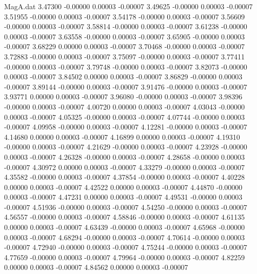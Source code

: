\begin{filecontents}{MagA.dat}
   3.47300   -0.00000    0.00003   -0.00007
   3.49625   -0.00000    0.00003   -0.00007
   3.51955   -0.00000    0.00003   -0.00007
   3.54178   -0.00000    0.00003   -0.00007
   3.56609   -0.00000    0.00003   -0.00007
   3.58814   -0.00000    0.00003   -0.00007
   3.61238   -0.00000    0.00003   -0.00007
   3.63558   -0.00000    0.00003   -0.00007
   3.65905   -0.00000    0.00003   -0.00007
   3.68229    0.00000    0.00003   -0.00007
   3.70468   -0.00000    0.00003   -0.00007
   3.72883   -0.00000    0.00003   -0.00007
   3.75097   -0.00000    0.00003   -0.00007
   3.77411   -0.00000    0.00003   -0.00007
   3.79748   -0.00000    0.00003   -0.00007
   3.82073   -0.00000    0.00003   -0.00007
   3.84502    0.00000    0.00003   -0.00007
   3.86829   -0.00000    0.00003   -0.00007
   3.89144   -0.00000    0.00003   -0.00007
   3.91476   -0.00000    0.00003   -0.00007
   3.93771    0.00000    0.00003   -0.00007
   3.96080   -0.00000    0.00003   -0.00007
   3.98396   -0.00000    0.00003   -0.00007
   4.00720    0.00000    0.00003   -0.00007
   4.03043   -0.00000    0.00003   -0.00007
   4.05325   -0.00000    0.00003   -0.00007
   4.07744   -0.00000    0.00003   -0.00007
   4.09958   -0.00000    0.00003   -0.00007
   4.12281   -0.00000    0.00003   -0.00007
   4.14680    0.00000    0.00003   -0.00007
   4.16899    0.00000    0.00003   -0.00007
   4.19310   -0.00000    0.00003   -0.00007
   4.21629   -0.00000    0.00003   -0.00007
   4.23928   -0.00000    0.00003   -0.00007
   4.26328   -0.00000    0.00003   -0.00007
   4.28658   -0.00000    0.00003   -0.00007
   4.30972    0.00000    0.00003   -0.00007
   4.33279   -0.00000    0.00003   -0.00007
   4.35582   -0.00000    0.00003   -0.00007
   4.37854   -0.00000    0.00003   -0.00007
   4.40228    0.00000    0.00003   -0.00007
   4.42522    0.00000    0.00003   -0.00007
   4.44870   -0.00000    0.00003   -0.00007
   4.47231    0.00000    0.00003   -0.00007
   4.49531   -0.00000    0.00003   -0.00007
   4.51936   -0.00000    0.00003   -0.00007
   4.54250   -0.00000    0.00003   -0.00007
   4.56557   -0.00000    0.00003   -0.00007
   4.58846   -0.00000    0.00003   -0.00007
   4.61135    0.00000    0.00003   -0.00007
   4.63439   -0.00000    0.00003   -0.00007
   4.65968   -0.00000    0.00003   -0.00007
   4.68294   -0.00000    0.00003   -0.00007
   4.70614   -0.00000    0.00003   -0.00007
   4.72940   -0.00000    0.00003   -0.00007
   4.75244   -0.00000    0.00003   -0.00007
   4.77659   -0.00000    0.00003   -0.00007
   4.79964   -0.00000    0.00003   -0.00007
   4.82259    0.00000    0.00003   -0.00007
   4.84562    0.00000    0.00003   -0.00007

\end{filecontents}
